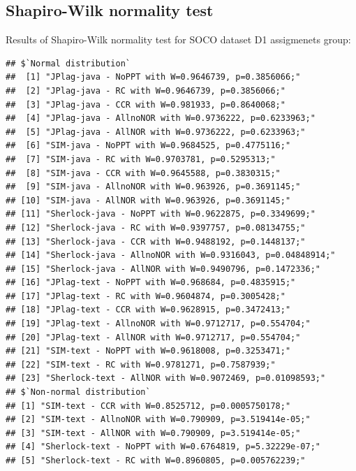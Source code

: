\documentclass[a4paper, 12pt, oneside, openany, final, pdftex]{book}\usepackage[]{graphicx}\usepackage[]{color}
\makeatletter
\newenvironment{kframe}{%
 \def\at@end@of@kframe{}%
 \ifinner\ifhmode%
  \def\at@end@of@kframe{\end{minipage}}%
  \begin{minipage}{\columnwidth}%
 \fi\fi%
 \def\FrameCommand##1{\hskip\@totalleftmargin \hskip-\fboxsep
 \colorbox{shadecolor}{##1}\hskip-\fboxsep
     \hskip-\linewidth \hskip-\@totalleftmargin \hskip\columnwidth}%
 \MakeFramed {\advance\hsize-\width
   \@totalleftmargin\z@ \linewidth\hsize
   \@setminipage}}%
 {\par\unskip\endMakeFramed%
 \at@end@of@kframe}
\newenvironment{knitrout}{}{} %
\makeatother
\begin{document}
\begin{appendices}
\begin{table}[ht]
\end{table}
  \chapter{Shapiro-Wilk normality test}\label{apx:swnormtest}

  

Results of Shapiro-Wilk normality test for SOCO dataset D1 assigmenets group:
\begin{knitrout}
\color{fgcolor}\begin{kframe}
\begin{verbatim}
## $`Normal distribution`
##  [1] "JPlag-java - NoPPT with W=0.9646739, p=0.3856066;"       
##  [2] "JPlag-java - RC with W=0.9646739, p=0.3856066;"          
##  [3] "JPlag-java - CCR with W=0.981933, p=0.8640068;"          
##  [4] "JPlag-java - AllnoNOR with W=0.9736222, p=0.6233963;"    
##  [5] "JPlag-java - AllNOR with W=0.9736222, p=0.6233963;"      
##  [6] "SIM-java - NoPPT with W=0.9684525, p=0.4775116;"         
##  [7] "SIM-java - RC with W=0.9703781, p=0.5295313;"            
##  [8] "SIM-java - CCR with W=0.9645588, p=0.3830315;"           
##  [9] "SIM-java - AllnoNOR with W=0.963926, p=0.3691145;"       
## [10] "SIM-java - AllNOR with W=0.963926, p=0.3691145;"         
## [11] "Sherlock-java - NoPPT with W=0.9622875, p=0.3349699;"    
## [12] "Sherlock-java - RC with W=0.9397757, p=0.08134755;"      
## [13] "Sherlock-java - CCR with W=0.9488192, p=0.1448137;"      
## [14] "Sherlock-java - AllnoNOR with W=0.9316043, p=0.04848914;"
## [15] "Sherlock-java - AllNOR with W=0.9490796, p=0.1472336;"   
## [16] "JPlag-text - NoPPT with W=0.968684, p=0.4835915;"        
## [17] "JPlag-text - RC with W=0.9604874, p=0.3005428;"          
## [18] "JPlag-text - CCR with W=0.9628915, p=0.3472413;"         
## [19] "JPlag-text - AllnoNOR with W=0.9712717, p=0.554704;"     
## [20] "JPlag-text - AllNOR with W=0.9712717, p=0.554704;"       
## [21] "SIM-text - NoPPT with W=0.9618008, p=0.3253471;"         
## [22] "SIM-text - RC with W=0.9781271, p=0.7587939;"            
## [23] "Sherlock-text - AllNOR with W=0.9072469, p=0.01098593;"
## $`Non-normal distribution`
## [1] "SIM-text - CCR with W=0.8525712, p=0.0005750178;"         
## [2] "SIM-text - AllnoNOR with W=0.790909, p=3.519414e-05;"     
## [3] "SIM-text - AllNOR with W=0.790909, p=3.519414e-05;"       
## [4] "Sherlock-text - NoPPT with W=0.6764819, p=5.32229e-07;"   
## [5] "Sherlock-text - RC with W=0.8960805, p=0.005762239;"      

\end{verbatim}
\end{kframe}
\end{knitrout}
\end{appendices}
\end{document}
